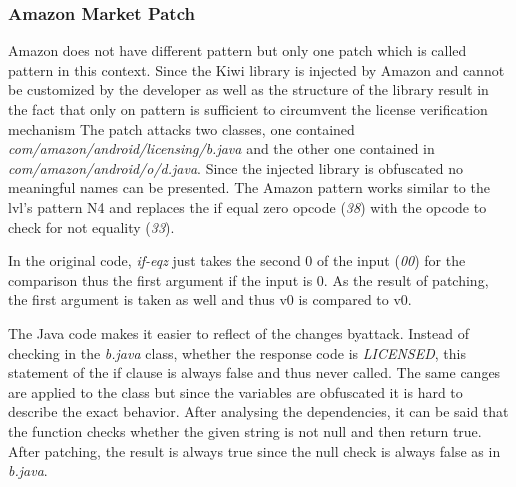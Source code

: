 \subsubsection{Amazon Market Patch}
Amazon does not have different pattern but only one patch which is called pattern in this context.
Since the Kiwi library is injected by Amazon and cannot be customized by the developer as well as the structure of the library result in the fact that only on pattern is sufficient to circumvent the license verification mechanism
The patch attacks two classes, one contained \textit{com/amazon/android/licensing/b.java} and the other one contained in \textit{com/amazon/android/o/d.java}.
Since the injected library is obfuscated no meaningful names can be presented.
\newline
The Amazon pattern works similar to the \gls{lvl}'s pattern N4 and replaces the if equal zero opcode (\textit{38}) with the opcode to check for not equality (\textit{33}).
\newline

In the original code, \textit{if-eqz} just takes the second 0 of the input (\textit{00}) for the comparison thus the first argument if the input is 0.
As the result of patching, the first argument is taken as well and thus v0 is compared to v0.

The Java code makes it easier to reflect of the changes byattack.
Instead of checking in the \textit{b.java} class, whether the response code is \textit{LICENSED}, this statement of the if clause is always false and thus never called.
The same canges are applied to the  class but since the variables are obfuscated it is hard to describe the exact behavior.
After analysing the dependencies, it can be said that the function checks whether the given string is not null and then return true.
After patching, the result is always true since the null check is always false as in \textit{b.java}.
\newline


